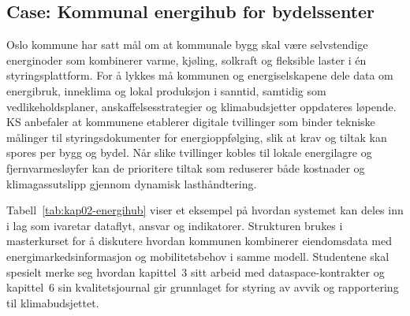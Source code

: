 \subsection{Case: Kommunal energihub for bydelssenter}
Oslo kommune har satt mål om at kommunale bygg skal være selvstendige energinoder som kombinerer varme, kjøling, solkraft og
fleksible laster i én styringsplattform.\citep{osloeiendom2023strategi,oslo2024klimaeiendom} For å lykkes må kommunen og
energiselskapene dele data om energibruk, inneklima og lokal produksjon i sanntid, samtidig som vedlikeholdsplaner,
anskaffelsesstrategier og klimabudsjetter oppdateres løpende. KS anbefaler at kommunene etablerer digitale tvillinger som
binder tekniske målinger til styringsdokumenter for energioppfølging, slik at krav og tiltak kan spores per bygg og bydel.
\citep{ks2024eiendomsdrift} Når slike tvillinger kobles til lokale energilagre og fjernvarmesløyfer kan de prioritere tiltak som
reduserer både kostnader og klimagassutslipp gjennom dynamisk lasthåndtering.\citep{norskfjernvarme2024fleksibilitet}

Tabell~\ref{tab:kap02-energihub} viser et eksempel på hvordan systemet kan deles inn i lag som ivaretar dataflyt, ansvar og
indikatorer. Strukturen brukes i masterkurset for å diskutere hvordan kommunen kombinerer eiendomsdata med energimarkedsinformasjon
og mobilitetsbehov i samme modell. Studentene skal spesielt merke seg hvordan kapittel~3 sitt arbeid med dataspace-kontrakter og
kapittel~6 sin kvalitetsjournal gir grunnlaget for styring av avvik og rapportering til klimabudsjettet.

